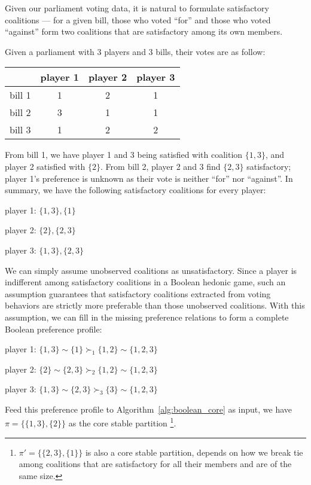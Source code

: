 Given our parliament voting data, it is natural to formulate satisfactory
coalitions --- for a given bill, those who voted ``for'' and those who voted
``against'' form two coalitions that are satisfactory among its own members.

\begin{example}
\label{example:votes_boolean}
  Given a parliament with 3 players and 3 bills, their votes are as follow:

  \begin{table}[h!]
  \centering
  \begin{tabular}{|c|c|c|c|}
  \hline
         & player 1 & player 2 & player 3 \\ \hline
  bill 1 & 1 & 2 & 1 \\
  bill 2 & 3 & 1 & 1 \\
  bill 3 & 1 & 2 & 2 \\
  \hline
  \end{tabular}
  \end{table}
\end{example}

From bill 1, we have player 1 and 3 being satisfied with coalition $\{1, 3\}$,
and player 2 satisfied with $\{2\}$.
From bill 2, player 2 and 3 find $\{2, 3\}$ satisfactory; player 1's preference
is unknown as their vote is neither ``for'' nor ``against''.
In summary, we have the following satisfactory coalitions for every player:

player 1: $\{1, 3\}, \{1\}$

player 2: $\{2\}, \{2, 3\}$

player 3: $\{1, 3\}, \{2, 3\}$

We can simply assume unobserved coalitions as unsatisfactory.
Since a player is indifferent among satisfactory coalitions in a Boolean hedonic
game, such an assumption guarantees that satisfactory coalitions extracted from
voting behaviors are strictly more preferable than those unobserved coalitions.
With this assumption, we can fill in the missing preference relations to
form a complete Boolean preference profile:

player 1: $\{1, 3\} \sim \{1\} \succ_1 \{1, 2\} \sim \{1, 2, 3\}$

player 2: $\{2\} \sim \{2, 3\} \succ_2 \{1, 2\} \sim \{1, 2, 3\}$

player 3: $\{1, 3\} \sim \{2, 3\} \succ_3 \{3\} \sim \{1, 2, 3\}$

Feed this preference profile to Algorithm~\ref{alg:boolean_core} as input, we
have $\pi = \{\{1, 3\}, \{2\}\}$ as the core stable partition
\footnote{$\pi' = \{\{2, 3\}, \{1\}\}$ is also a core stable partition, depends
on how we break tie among coalitions that are satisfactory for all their members
and are of the same size.}.

